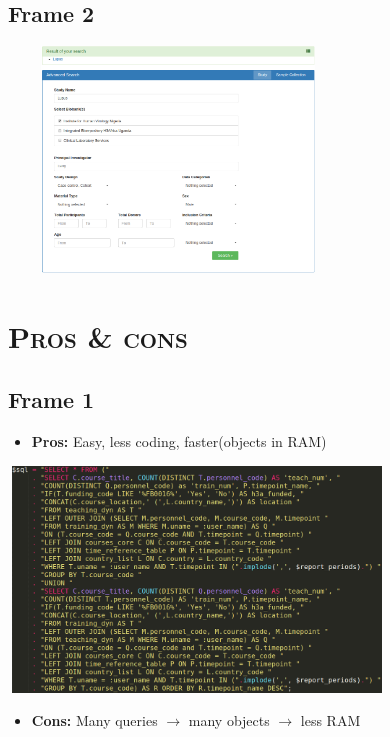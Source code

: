 \documentclass[xcolor=x11names,compress]{beamer}
\renewcommand{\(}{\begin{columns}}
\renewcommand{\)}{\end{columns}}
\newcommand{\<}[1]{\begin{column}{#1}}
\renewcommand{\>}{\end{column}}
\begin{document}
\subsection{Frame 2}
\begin{frame}{}
  \begin{block}{}
    \includegraphics[width=9cm, height=6cm]{images/form.png}
  \end{block}
\end{frame}

\section{\scshape Pros \& cons}
\subsection{Frame 1}
\begin{frame}{}
  \begin{itemize}
   \item \textbf{Pros:} Easy, less coding, faster(objects in RAM)
  \end{itemize}
  \begin{block}{}
    \includegraphics[width=10cm, height=6cm]{images/sql.png}
  \end{block}
  \begin{itemize}
   \item \textbf{Cons:} Many queries $\longrightarrow$ many objects $\longrightarrow$ less RAM
  \end{itemize}
\end{frame}
\end{document}
